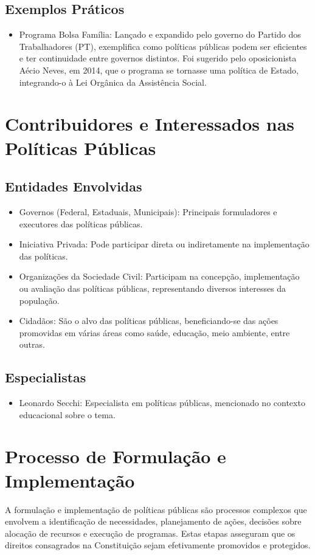 \documentclass[
   article,       
   12pt,          
   oneside,       
   a4paper,       
   english,       
   brazil,        
   sumario=tradicional
   ]{abntex2}
\begin{document}
\subsection{Exemplos Práticos}
\begin{itemize}
\item Programa Bolsa Família: Lançado e expandido pelo governo do Partido dos Trabalhadores (PT), exemplifica como políticas públicas podem ser eficientes e ter continuidade entre governos distintos. Foi sugerido pelo oposicionista Aécio Neves, em 2014, que o programa se tornasse uma política de Estado, integrando-o à Lei Orgânica da Assistência Social.
\end{itemize}

\section{Contribuidores e Interessados nas Políticas Públicas}
\subsection{Entidades Envolvidas}
\begin{itemize}
\item Governos (Federal, Estaduais, Municipais): Principais formuladores e executores das políticas públicas.
\item Iniciativa Privada: Pode participar direta ou indiretamente na implementação das políticas.
\item Organizações da Sociedade Civil: Participam na concepção, implementação ou avaliação das políticas públicas, representando diversos interesses da população.
\item Cidadãos: São o alvo das políticas públicas, beneficiando-se das ações promovidas em várias áreas como saúde, educação, meio ambiente, entre outras.
\end{itemize}

\subsection{Especialistas}
\begin{itemize}
\item Leonardo Secchi: Especialista em políticas públicas, mencionado no contexto educacional sobre o tema.
\end{itemize}

\section{Processo de Formulação e Implementação}
A formulação e implementação de políticas públicas são processos complexos que envolvem a identificação de necessidades, planejamento de ações, decisões sobre alocação de recursos e execução de programas. Estas etapas asseguram que os direitos consagrados na Constituição sejam efetivamente promovidos e protegidos.
\end{document}
